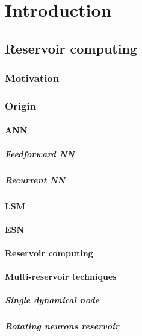 \chapter{Introduction}\label{ch:Introduction}

\section{Reservoir computing}\label{sec:1:RC}
\subsection{Motivation}
\subsection{Origin}
\subsubsection{ANN}
\paragraph{Feedforward NN}
\paragraph{Recurrent NN}
\subsubsection{LSM}
\subsubsection{ESN}
\subsubsection{Reservoir computing}
\subsubsection{Multi-reservoir techniques}
\paragraph{Single dynamical node}
\paragraph{Rotating neurons reservoir}
